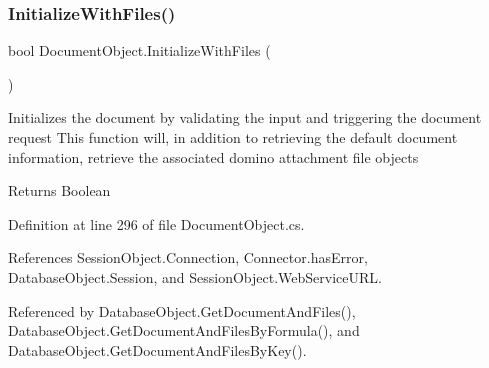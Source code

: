 \mbox{\label{class_document_object_a83f0e855adc5fb7afd02d2e34767f5c8}} 
\subsubsection{\texorpdfstring{Initialize\+With\+Files()}{InitializeWithFiles()}}
{\footnotesize\ttfamily bool Document\+Object.\+Initialize\+With\+Files (\begin{DoxyParamCaption}{ }\end{DoxyParamCaption})}



Initializes the document by validating the input and triggering the document request This function will, in addition to retrieving the default document information, retrieve the associated domino attachment file objects 

\begin{DoxyReturn}{Returns}
Boolean
\end{DoxyReturn}


Definition at line 296 of file Document\+Object.\+cs.



References Session\+Object.\+Connection, Connector.\+has\+Error, Database\+Object.\+Session, and Session\+Object.\+Web\+Service\+U\+RL.



Referenced by Database\+Object.\+Get\+Document\+And\+Files(), Database\+Object.\+Get\+Document\+And\+Files\+By\+Formula(), and Database\+Object.\+Get\+Document\+And\+Files\+By\+Key().



